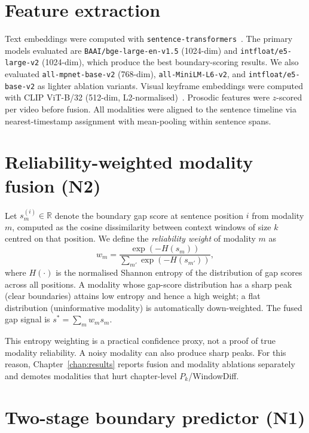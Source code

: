\section{Feature extraction}
\label{sec:features}

Text embeddings were computed with \texttt{sentence-transformers}~\cite{reimers2019sbert}.
The primary models evaluated are \texttt{BAAI/bge-large-en-v1.5} (1024-dim) and
\texttt{intfloat/e5-large-v2} (1024-dim), which produce the best boundary-scoring
results. We also evaluated \texttt{all-mpnet-base-v2} (768-dim), \texttt{all-MiniLM-L6-v2},
and \texttt{intfloat/e5-base-v2} as lighter ablation variants.
Visual keyframe embeddings were computed with CLIP ViT-B/32
(512-dim, L2-normalised)~\cite{radford2021clip}.
Prosodic features were $z$-scored per video before fusion.
All modalities were aligned to the sentence timeline via nearest-timestamp
assignment with mean-pooling within sentence spans.

\section{Reliability-weighted modality fusion (N2)}
\label{sec:fusion}

Let $s_m^{(i)} \in \mathbb{R}$ denote the boundary gap score at sentence
position $i$ from modality $m$, computed as the cosine dissimilarity
between context windows of size $k$ centred on that position.
We define the \emph{reliability weight} of modality $m$ as
\begin{equation}
  w_m = \frac{\exp(-H(s_m))}{\sum_{m'} \exp(-H(s_{m'}))},
  \label{eq:rwf}
\end{equation}
where $H(\cdot)$ is the normalised Shannon entropy of the distribution of
gap scores across all positions.
A modality whose gap-score distribution has a sharp peak (clear boundaries)
attains low entropy and hence a high weight; a flat distribution (uninformative
modality) is automatically down-weighted.
The fused gap signal is $s^* = \sum_m w_m s_m$.

This entropy weighting is a practical confidence proxy, not a proof of true
modality reliability. A noisy modality can also produce sharp peaks. For this
reason, Chapter~\ref{chap:results} reports fusion and modality ablations
separately and demotes modalities that hurt chapter-level $P_k$/WindowDiff.

\section{Two-stage boundary predictor (N1)}
\label{sec:boundary}

